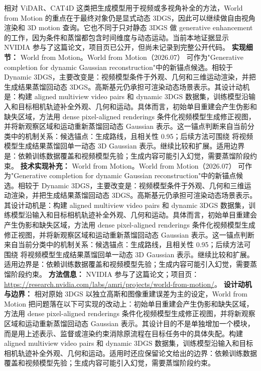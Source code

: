 相对 ViDAR、CAT4D 这类把生成模型用于视频或多视角补全的方法，World from Motion 的重点在于最终对象仍是显式动态 3DGS，因此可以继续做自由视角渲染和 3D motion 查询。它也不同于只对静态 3DGS 做 generative enhancement 的工作，因为条件和蒸馏都包含时间维度与动态运动。当前本地证据显示 NVIDIA 参与了这篇论文，项目页已公开，但尚未记录到完整公开代码。
\textbf{实现细节：} World from Motion。World from Motion（2026.07） 可作为"Generative completion for dynamic Gaussian reconstruction"中的新锚点候选。相较于 Dynamic 3DGS，主要改变是：视频模型条件于外观、几何和三维运动渲染，并把生成结果蒸馏回动态 3DGS。高斯基元仍承担可渲染动态场景表示。其设计动机是：构建 aligned multiview video pairs 和 dynamic 3DGS 数据集，训练模型沿输入和目标相机轨迹补全外观、几何和运动。具体而言，初始单目重建会产生伪影和缺失区域，方法用 dense pixel-aligned renderings 条件化视频模型生成修正视图，并将新观察区域和运动重新蒸馏回动态 Gaussian 表示。这一锚点判断来自当前分类中的机制关系：候选锚点：生成路线，且相关性 0.95；后续方法可围绕 将视频模型生成结果蒸馏回单一动态 3D Gaussian 表示。继续比较和扩展。适用边界是：依赖训练数据覆盖和视频模型先验；生成内容可能引入幻觉，需要蒸馏阶段约束。
\textbf{技术实现补充：} World from Motion。World from Motion（2026.07） 可作为"Generative completion for dynamic Gaussian reconstruction"中的新锚点候选。相较于 Dynamic 3DGS，主要改变是：视频模型条件于外观、几何和三维运动渲染，并把生成结果蒸馏回动态 3DGS。高斯基元仍承担可渲染动态场景表示。其设计动机是：构建 aligned multiview video pairs 和 dynamic 3DGS 数据集，训练模型沿输入和目标相机轨迹补全外观、几何和运动。具体而言，初始单目重建会产生伪影和缺失区域，方法用 dense pixel-aligned renderings 条件化视频模型生成修正视图，并将新观察区域和运动重新蒸馏回动态 Gaussian 表示。这一锚点判断来自当前分类中的机制关系：候选锚点：生成路线，且相关性 0.95；后续方法可围绕 将视频模型生成结果蒸馏回单一动态 3D Gaussian 表示。继续比较和扩展。适用边界是：依赖训练数据覆盖和视频模型先验；生成内容可能引入幻觉，需要蒸馏阶段约束。
\textbf{方法信息：} NVIDIA 参与了这篇论文；项目页：\url{https://research.nvidia.com/labs/amri/projects/world-from-motion/}。
\textbf{设计动机与边界：} 相对原始 3DGS 以独立高斯和图像重建误差为主的设定，World from Motion 把问题落在以下可实现的改动上：初始单目重建会产生伪影和缺失区域，方法用 dense pixel-aligned renderings 条件化视频模型生成修正视图，并将新观察区域和运动重新蒸馏回动态 Gaussian 表示。其设计目的不是单独增加一个模块，而是用上述表示、监督或渲染约束消除原流程在目标任务中的具体失配。构建 aligned multiview video pairs 和 dynamic 3DGS 数据集，训练模型沿输入和目标相机轨迹补全外观、几何和运动。适用时还应保留论文给出的边界：依赖训练数据覆盖和视频模型先验；生成内容可能引入幻觉，需要蒸馏阶段约束。

